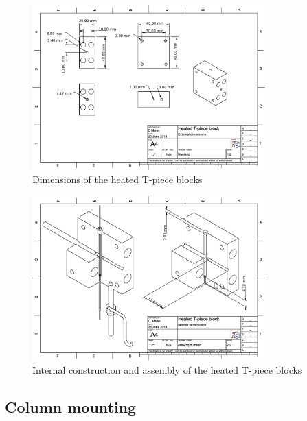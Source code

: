 \begin{figure}
	\centering
	\includegraphics[angle=90, origin=c, width=0.8\textwidth]{./Figures/ManifoldDimensions.pdf}
	\decoRule

\caption[Manifold dimensions.]{Dimensions of the heated T-piece blocks}
	
	\label{fig:ManifoldDims}
\end{figure}

\begin{figure}
	\centering
	\includegraphics[angle=90, origin=c, width=0.8\textwidth]{./Figures/ManifoldAssemby.pdf}
	\decoRule
	
\caption[Manifold assembly.]{Internal construction and assembly of the heated T-piece blocks}
	
	\label{fig:ManifoldAssy}
\end{figure}


\subsection{Column mounting}


